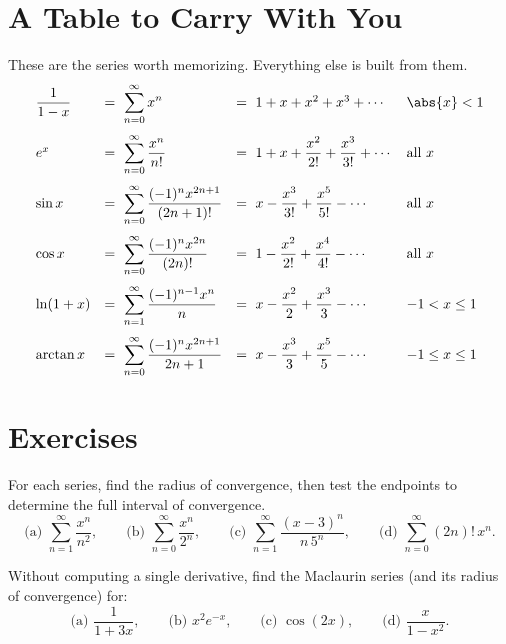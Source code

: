 \section{A Table to Carry With You}
\label{ch30:sec-table}

These are the series worth memorizing. Everything else is built from them.
\[
\begin{array}{llll}
\dfrac{1}{1-x} &=\ \displaystyle\sum_{n=0}^{\infty} x^n &=\ 1 + x + x^2 + x^3 + \cdots & \abs{x}<1 \\[1.6em]
e^x &=\ \displaystyle\sum_{n=0}^{\infty} \dfrac{x^n}{n!} &=\ 1 + x + \dfrac{x^2}{2!} + \dfrac{x^3}{3!} + \cdots & \text{all } x \\[1.6em]
\sin x &=\ \displaystyle\sum_{n=0}^{\infty} \dfrac{(-1)^n x^{2n+1}}{(2n+1)!} &=\ x - \dfrac{x^3}{3!} + \dfrac{x^5}{5!} - \cdots & \text{all } x \\[1.6em]
\cos x &=\ \displaystyle\sum_{n=0}^{\infty} \dfrac{(-1)^n x^{2n}}{(2n)!} &=\ 1 - \dfrac{x^2}{2!} + \dfrac{x^4}{4!} - \cdots & \text{all } x \\[1.6em]
\ln(1+x) &=\ \displaystyle\sum_{n=1}^{\infty} \dfrac{(-1)^{n-1} x^n}{n} &=\ x - \dfrac{x^2}{2} + \dfrac{x^3}{3} - \cdots & -1 < x \le 1 \\[1.6em]
\arctan x &=\ \displaystyle\sum_{n=0}^{\infty} \dfrac{(-1)^n x^{2n+1}}{2n+1} &=\ x - \dfrac{x^3}{3} + \dfrac{x^5}{5} - \cdots & -1 \le x \le 1
\end{array}
\]

\section{Exercises}
\label{ch30:sec-exercises}

\begin{exercise}
For each series, find the radius of convergence, then test the endpoints to determine the full interval of convergence.
\[
  \text{(a) } \sum_{n=1}^{\infty}\frac{x^n}{n^2},
  \qquad
  \text{(b) } \sum_{n=0}^{\infty}\frac{x^n}{2^n},
  \qquad
  \text{(c) } \sum_{n=1}^{\infty}\frac{(x-3)^n}{n\,5^n},
  \qquad
  \text{(d) } \sum_{n=0}^{\infty} (2n)!\,x^n.
\]
\end{exercise}

\begin{exercise}
Without computing a single derivative, find the Maclaurin series (and its radius of convergence) for:
\[
  \text{(a) } \frac{1}{1+3x},
  \qquad
  \text{(b) } x^2 e^{-x},
  \qquad
  \text{(c) } \cos(2x),
  \qquad
  \text{(d) } \frac{x}{1-x^2}.
\]
\end{exercise}

